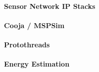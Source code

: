 \paragraph{Sensor Network IP Stacks}
\cite{ko2011beyond} %
\cite{dunkels2009efficient} %
\cite{Durvy:2008:MSN:1460412.1460483} %
\cite{dunkels2003full} %

\cite{Christin_Reinhardt_Mogre_Steinmetz_2009}

\paragraph{Cooja / MSPSim}
\cite{Eriksson:2009:CIT:1537614.1537650} %

\paragraph{Protothreads}
\cite{Dunkels:2006:PSE:1182807.1182811} %

\paragraph{Energy Estimation}
\cite{Dunkels:2007:SOE:1278972.1278979} %

